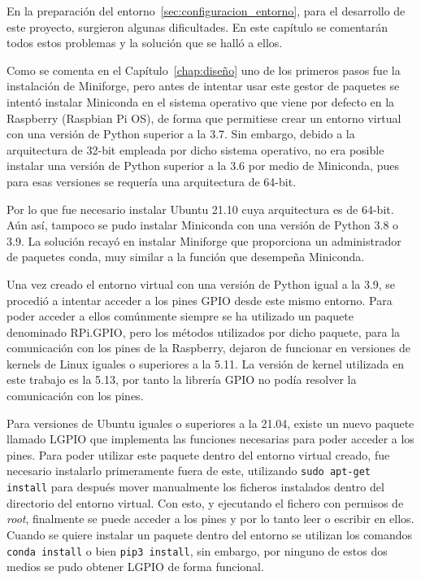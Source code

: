 \documentclass[a4paper, 12pt]{book}
\begin{document}
En la preparación del entorno~\ref{sec:configuracion_entorno}, para el desarrollo de este proyecto, surgieron algunas dificultades. En este capítulo se comentarán todos estos problemas y la solución que se halló a ellos.

Como se comenta en el Capítulo~\ref{chap:diseño} uno de los primeros pasos fue la instalación de Miniforge, pero antes de intentar usar este gestor de paquetes se intentó instalar Miniconda en el sistema operativo que viene por defecto en la Raspberry (Raspbian Pi OS), de forma que permitiese crear un entorno virtual con una versión de Python superior a la 3.7. Sin embargo, debido a la arquitectura de 32-bit empleada por dicho sistema operativo, no era posible instalar una versión de Python superior a la 3.6 por medio de Miniconda, pues para esas versiones se requería una arquitectura de 64-bit.

Por lo que fue necesario instalar Ubuntu 21.10 cuya arquitectura es de 64-bit. Aún así, tampoco se pudo instalar Miniconda con una versión de Python 3.8 o 3.9. La solución recayó en instalar Miniforge que proporciona un administrador de paquetes conda, muy similar a la función que desempeña Miniconda.

Una vez creado el entorno virtual con una versión de Python igual a la 3.9, se procedió a intentar acceder a los pines GPIO desde este mismo entorno. Para poder acceder a ellos comúnmente siempre se ha utilizado un paquete denominado RPi.GPIO, pero los métodos utilizados por dicho paquete, para la comunicación con los pines de la Raspberry, dejaron de funcionar en versiones de kernels de Linux iguales o superiores a la 5.11. La versión de kernel utilizada en este trabajo es la 5.13, por tanto la librería GPIO no podía resolver la comunicación con los pines.

Para versiones de Ubuntu iguales o superiores a la 21.04, existe un nuevo paquete llamado LGPIO que implementa las funciones necesarias para poder acceder a los pines. Para poder utilizar este paquete dentro del entorno virtual creado, fue necesario instalarlo primeramente fuera de este, utilizando \texttt{sudo apt-get install} para después mover manualmente los ficheros instalados dentro del directorio del entorno virtual. Con esto, y ejecutando el fichero con permisos de \textit{root}, finalmente se puede acceder a los pines y por lo tanto leer o escribir en ellos.\\
Cuando se quiere instalar un paquete dentro del entorno se utilizan los comandos \texttt{conda install} o bien \texttt{pip3 install}, sin embargo, por ninguno de estos dos medios se pudo obtener LGPIO de forma funcional.
\end{document}
